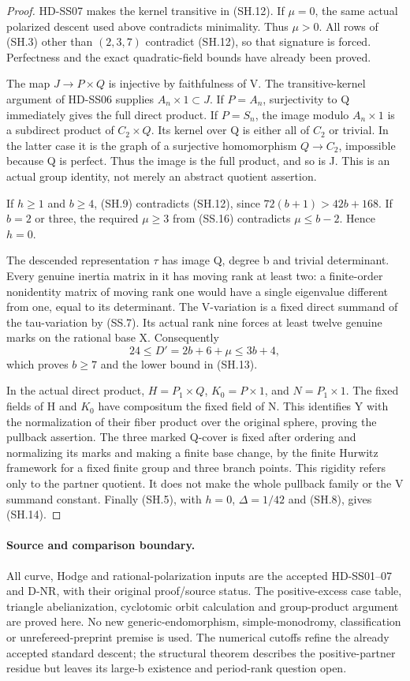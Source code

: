 \begin{proof}
HD-SS07 makes the kernel transitive in (SH.12). If \(\mu=0\),
the same actual polarized descent used above contradicts minimality.
Thus \(\mu>0\). All rows of (SH.3) other than \((2,3,7)\)
contradict (SH.12), so that signature is forced. Perfectness and
the exact quadratic-field bounds have already been proved.

The map \(J\to P\times Q\) is injective by faithfulness of V.
The transitive-kernel argument of HD-SS06 supplies
\(A_n\times1\subset J\). If \(P=A_n\), surjectivity to Q
immediately gives the full direct product. If \(P=S_n\), the
image modulo \(A_n\times1\) is a subdirect product of
\(C_2\times Q\). Its kernel over Q is either all of \(C_2\)
or trivial. In the latter case it is the graph of a surjective
homomorphism \(Q\to C_2\), impossible because Q is perfect.
Thus the image is the full product, and so is J. This is an
actual group identity, not merely an abstract quotient assertion.

If \(h\ge1\) and \(b\ge4\), (SH.9) contradicts (SH.12),
since \(72(b+1)>42b+168\). If \(b=2\) or three, the required
\(\mu\ge3\) from (SS.16) contradicts \(\mu\le b-2\).
Hence \(h=0\).

The descended representation \(\tau\) has image Q, degree b and
trivial determinant. Every genuine inertia matrix in it has
moving rank at least two: a finite-order nonidentity matrix of
moving rank one would have a single eigenvalue different from one, equal
to its determinant. The V-variation is a fixed direct summand
of the tau-variation by (SS.7). Its actual rank nine forces at
least twelve genuine marks on the rational base X. Consequently
\[
                    24\le D'=2b+6+\mu\le3b+4,
 \tag{SH.15}
\]
which proves \(b\ge7\) and the lower bound in (SH.13).

In the actual direct product, \(H=P_1\times Q\),
\(K_0=P\times1\), and \(N=P_1\times1\). The fixed fields
of H and \(K_0\) have compositum the fixed field of N.
This identifies Y with the normalization of their fiber product
over the original sphere, proving the pullback assertion.
The three marked Q-cover is fixed after ordering and normalizing
its marks and making a finite base change, by the finite Hurwitz
framework for a fixed finite group and three branch points.
This rigidity refers only to the partner quotient. It does not
make the whole pullback family or the V summand constant.
Finally (SH.5), with \(h=0\), \(\Delta=1/42\) and (SH.8),
gives (SH.14).
\end{proof}

\paragraph{Source and comparison boundary.}
All curve, Hodge and rational-polarization inputs are the accepted
HD-SS01--07 and D-NR, with their original proof/source status.
The positive-excess case table, triangle abelianization, cyclotomic
orbit calculation and group-product argument are proved here.
No new generic-endomorphism, simple-monodromy, classification or
unrefereed-preprint premise is used. The numerical cutoffs refine
the already accepted standard descent; the structural theorem
describes the positive-partner residue but leaves its large-b
existence and period-rank question open.
